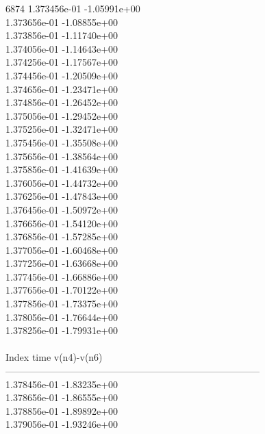 6874	1.373456e-01	-1.05991e+00	\\ 	1.373656e-01	-1.08855e+00	\\ 	1.373856e-01	-1.11740e+00	\\ 	1.374056e-01	-1.14643e+00	\\ 	1.374256e-01	-1.17567e+00	\\ 	1.374456e-01	-1.20509e+00	\\ 	1.374656e-01	-1.23471e+00	\\ 	1.374856e-01	-1.26452e+00	\\ 	1.375056e-01	-1.29452e+00	\\ 	1.375256e-01	-1.32471e+00	\\ 	1.375456e-01	-1.35508e+00	\\ 	1.375656e-01	-1.38564e+00	\\ 	1.375856e-01	-1.41639e+00	\\ 	1.376056e-01	-1.44732e+00	\\ 	1.376256e-01	-1.47843e+00	\\ 	1.376456e-01	-1.50972e+00	\\ 	1.376656e-01	-1.54120e+00	\\ 	1.376856e-01	-1.57285e+00	\\ 	1.377056e-01	-1.60468e+00	\\ 	1.377256e-01	-1.63668e+00	\\ 	1.377456e-01	-1.66886e+00	\\ 	1.377656e-01	-1.70122e+00	\\ 	1.377856e-01	-1.73375e+00	\\ 	1.378056e-01	-1.76644e+00	\\ 	1.378256e-01	-1.79931e+00	\\ \hline
\\ \hline
Index   time            v(n4)-v(n6)     \\ \hline
--------------------------------------------------------------------------------\\ 	1.378456e-01	-1.83235e+00	\\ 	1.378656e-01	-1.86555e+00	\\ 	1.378856e-01	-1.89892e+00	\\ 	1.379056e-01	-1.93246e+00	\\ \hline

